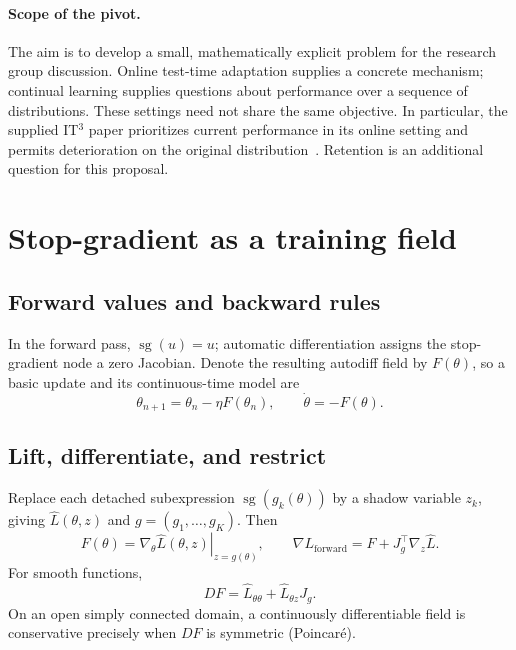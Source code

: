 \documentclass[11pt,a4paper]{article}
\newcommand{\sg}{\operatorname{sg}}
\newif\ifdraftnotes
\newcommand{\draftnote}[1]{\ifdraftnotes\par\smallskip
  {\small\color{gray}\noindent\textit{To develop:} #1\par}\smallskip\fi}
\begin{document}
\paragraph{Scope of the pivot.}
The aim is to develop a small, mathematically explicit problem for the research
group discussion. Online test-time adaptation supplies a concrete mechanism;
continual learning supplies questions about performance over a sequence of
distributions. These settings need not share the same objective. In particular,
the supplied IT$^3$ paper prioritizes current performance in its online setting
and permits deterioration on the original distribution~\cite{it3}.
Retention is an additional question for this proposal.
\draftnote{Choose whether the first result should address fixed-distribution
stability, tracking under drift, or retention after a switch. Do not promise
all three in the first theorem.}

\section{Stop-gradient as a training field}
\label{sec:framework}
\subsection{Forward values and backward rules}
In the forward pass, $\sg(u)=u$; automatic differentiation assigns the
stop-gradient node a zero Jacobian. Denote the resulting autodiff field by
$F(\theta)$, so a basic update and its continuous-time model are
\[
 \theta_{n+1}=\theta_n-\eta F(\theta_n),
 \qquad \dot\theta=-F(\theta).
\]
\draftnote{Include the scalar example where the forward loss and a potential
of $F$ differ, followed by the planar rotation example. Distinguish continuous
flow from discrete updates. Stop-gradient need not destroy conservativity.}

\subsection{Lift, differentiate, and restrict}
Replace each detached subexpression $\sg(g_k(\theta))$ by a shadow variable
$z_k$, giving $\widehat L(\theta,z)$ and $g=(g_1,\ldots,g_K)$. Then
\begin{equation}
 F(\theta)=\left.\nabla_\theta\widehat L(\theta,z)\right|_{z=g(\theta)},
 \qquad
 \nabla L_{\mathrm{forward}}=F+J_g^\top\nabla_z\widehat L.
 \label{eq:lift}
\end{equation}
For smooth functions,
\begin{equation}
 DF=\widehat L_{\theta\theta}+\widehat L_{\theta z}J_g.
 \label{eq:jacobian}
\end{equation}
On an open simply connected domain, a continuously differentiable field is
conservative precisely when $DF$ is symmetric (Poincaré).
\draftnote{Derive these identities and explain vector-valued shadows. Introduce
the game interpretation for suitable parameter blocks; a shadow is not
automatically an independent optimizing player.}
\end{document}
